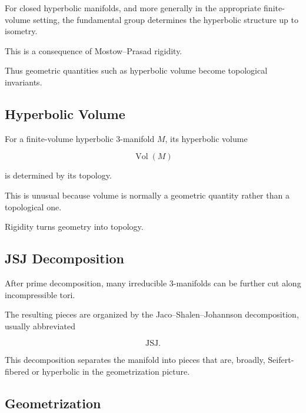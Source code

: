 For closed hyperbolic manifolds, and more generally in the appropriate
finite-volume setting, the fundamental group determines the hyperbolic
structure up to isometry.

This is a consequence of Mostow--Prasad rigidity.

Thus geometric quantities such as hyperbolic volume become topological
invariants.

\subsection{Hyperbolic Volume}
\label{subsec:hyperbolic-volume-topology}

For a finite-volume hyperbolic \(3\)-manifold \(M\), its hyperbolic volume

\[
\boxed{
\operatorname{Vol}(M)
}
\]

is determined by its topology.

This is unusual because volume is normally a geometric quantity rather than
a topological one.

Rigidity turns geometry into topology.

\subsection{JSJ Decomposition}
\label{subsec:jsj-decomposition}

After prime decomposition, many irreducible \(3\)-manifolds can be further
cut along incompressible tori.

The resulting pieces are organized by the
Jaco--Shalen--Johannson decomposition, usually abbreviated

\[
\boxed{
\mathrm{JSJ}.
}
\]

This decomposition separates the manifold into pieces that are, broadly,
Seifert-fibered or hyperbolic in the geometrization picture.

\subsection{Geometrization}
\label{subsec:geometrization}

